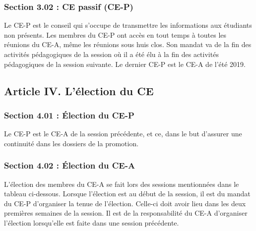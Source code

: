 \subsubsection*{Section 3.02 : CE passif (CE-P)}
Le CE-P est le conseil qui s’occupe de transmettre les informations aux étudiants non présents. Les membres du CE-P ont accès en tout temps à toutes les réunions du CE-A, même les réunions sous huis clos. Son mandat va de la fin des activités pédagogiques de la session où il a été élu à la fin des activités pédagogiques de la session suivante. Le dernier CE-P est le CE-A  de l’été 2019.

\subsection*{Article IV. L'élection du CE}

\subsubsection*{Section 4.01 : Élection du CE-P}
Le CE-P est le CE-A de la session précédente, et ce, dans le but d’assurer une continuité dans les dossiers de la promotion.

\subsubsection*{Section 4.02 : Élection du CE-A}
L’élection des membres du CE-A se fait lors des sessions mentionnées dans le tableau ci-dessous. Lorsque l’élection est au début de la session, il est du mandat du CE-P d’organiser la tenue de l'élection. Celle-ci doit avoir lieu dans les deux premières semaines de la session. Il est de la responsabilité du CE-A d’organiser l’élection lorsqu’elle est faite dans une session précédente.

